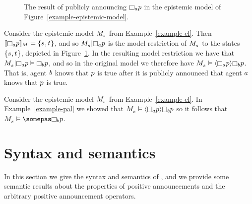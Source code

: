 \begin{example}\label{example-pal}
\begin{figure}
    \caption{The result of publicly announcing $\knows[\agentA] \atomP$ in the epistemic model of Figure~\ref{example-epistemic-model}.}\label{example-public-announcement}
    \centering
\end{figure}
Consider the epistemic model $\kPModel{\kStateS}$ from Example~\ref{example-el}.
Then $\interpretation[\kModel]{\knows[\agentA] \atomP} = \{\kStateS, \kStateT\}$, and so $\restrict{\kPModel{\kStateS}}{\knows[\agentA] \atomP}$ is the model restriction of $\kPModel{\kStateS}$ to the states $\{\kStateS, \kStateT\}$, depicted in Figure~\ref{example-public-announcement}.  
In the resulting model restriction we have that $\restrict{\kPModel{\kStateS}}{\knows[\agentA] \atomP} \entails \knows[\agentB] \atomP$, and so in the original model we therefore have $\kPModel{\kStateS} \entails \announceE{\knows[\agentA] \atomP} \knows[\agentB] \atomP$.
That is, agent $b$ knows that $p$ is true after it is publicly announced that agent $a$ knows that $p$ is true.
\end{example}

\begin{example}\label{example-apal}
Consider the epistemic model $\kPModel{\kStateS}$ from Example~\ref{example-el}.
In Example~\ref{example-pal} we showed that $\kPModel{\kStateS} \entails \announceE{\knows[\agentA] \atomP} \knows[\agentB] \atomP$ so it follows that $\kPModel{\kStateS} \entails \somepas \knows[\agentB] \atomP$.
\end{example}


\section{Syntax and semantics}\label{syntax-semantics}

In this section we give the syntax and semantics of \logicPapalS{}, and we provide some semantic results about the properties of positive announcements and the arbitrary positive announcement operators.


